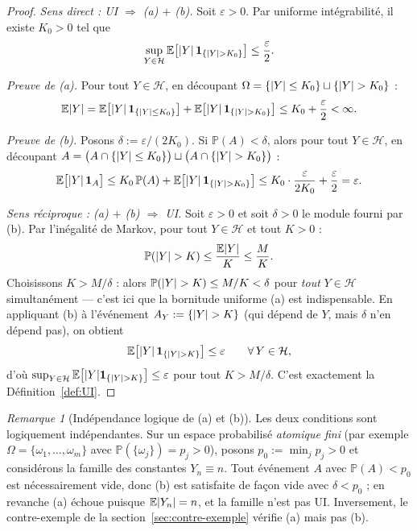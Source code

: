 \documentclass[11pt,a4paper]{article}
\theoremstyle{definition}
\theoremstyle{remark}
\newtheorem{remark}[theorem]{Remarque}
\newcommand{\E}{\mathbb{E}}
\newcommand{\PP}{\mathbb{P}}
\newcommand{\Hf}{\mathcal{H}}
\newcommand{\ind}[1]{\mathbf{1}_{#1}}
\DeclarePairedDelimiter{\abs}{\lvert}{\rvert}
\begin{document}
\begin{proof}
\emph{Sens direct : UI $\Rightarrow$ (a) $+$ (b).}
Soit $\varepsilon > 0$. Par uniforme intégrabilité, il existe $K_0 > 0$ tel que
\begin{equation}\label{eq:UI-K0}
\sup_{Y \in \Hf} \E\big[\abs{Y}\,\ind{\{\abs{Y} > K_0\}}\big] \le \frac{\varepsilon}{2}.
\end{equation}

\emph{Preuve de (a).} Pour tout $Y \in \Hf$, en découpant
$\Omega = \{\abs{Y} \le K_0\} \sqcup \{\abs{Y} > K_0\}$ :
\[
\E\abs{Y}
= \E\big[\abs{Y}\,\ind{\{\abs{Y} \le K_0\}}\big]
+ \E\big[\abs{Y}\,\ind{\{\abs{Y} > K_0\}}\big]
\le K_0 + \frac{\varepsilon}{2} < \infty .
\]

\emph{Preuve de (b).} Posons $\delta := \varepsilon / (2K_0)$. Si
$\PP(A) < \delta$, alors pour tout $Y \in \Hf$, en découpant
$A = \big(A \cap \{\abs{Y} \le K_0\}\big) \sqcup \big(A \cap \{\abs{Y} > K_0\}\big)$ :
\[
\E\big[\abs{Y}\,\ind{A}\big]
\le K_0\,\PP(A) + \E\big[\abs{Y}\,\ind{\{\abs{Y} > K_0\}}\big]
\le K_0 \cdot \frac{\varepsilon}{2K_0} + \frac{\varepsilon}{2}
= \varepsilon .
\]

\emph{Sens réciproque : (a) $+$ (b) $\Rightarrow$ UI.}
Soit $\varepsilon > 0$ et soit $\delta > 0$ le module fourni par (b).
Par l'inégalité de Markov, pour tout $Y \in \Hf$ et tout $K > 0$ :
\[
\PP(\abs{Y} > K) \le \frac{\E\abs{Y}}{K} \le \frac{M}{K}.
\]
Choisissons $K > M/\delta$ : alors $\PP(\abs{Y} > K) \le M/K < \delta$ pour
\emph{tout} $Y \in \Hf$ simultanément --- c'est ici que la bornitude uniforme (a)
est indispensable. En appliquant (b) à l'événement $A_Y := \{\abs{Y} > K\}$
(qui dépend de $Y$, mais $\delta$ n'en dépend pas), on obtient
\[
\E\big[\abs{Y}\,\ind{\{\abs{Y} > K\}}\big] \le \varepsilon
\qquad \forall\, Y \in \Hf ,
\]
d'où $\sup_{Y \in \Hf} \E\big[\abs{Y}\ind{\{\abs{Y}>K\}}\big] \le \varepsilon$
pour tout $K > M/\delta$. C'est exactement la Définition~\ref{def:UI}.
\end{proof}

\begin{remark}[Indépendance logique de (a) et (b)]
Les deux conditions sont logiquement indépendantes. Sur un espace probabilisé
\emph{atomique fini} (par exemple $\Omega = \{\omega_1,\dots,\omega_m\}$ avec
$\PP(\{\omega_j\}) = p_j > 0$), posons $p_0 := \min_j p_j > 0$ et considérons la
famille des constantes $Y_n \equiv n$. Tout événement $A$ avec
$\PP(A) < p_0$ est nécessairement vide, donc (b) est satisfaite de façon vide
avec $\delta < p_0$ ; en revanche (a) échoue puisque $\E\abs{Y_n} = n$, et la
famille n'est pas UI. Inversement, le contre-exemple de la
section~\ref{sec:contre-exemple} vérifie (a) mais pas (b).
\end{remark}
\end{document}
